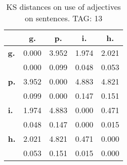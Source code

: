 \begin{table}[h!]
\begin{center}
\begin{tabular}{| l || c | c | c | c |}\hline
 & {\bf g.} & {\bf p.} & {\bf i.} & {\bf h.} \\\hline\hline
{\bf g.} & 0.000 & 3.952 & 1.974 & 2.021 \\
{\bf } & 0.000 & 0.099 & 0.048 & 0.053 \\\hline
{\bf p.} & 3.952 & 0.000 & 4.883 & 4.821 \\
{\bf } & 0.099 & 0.000 & 0.147 & 0.151 \\\hline
{\bf i.} & 1.974 & 4.883 & 0.000 & 0.471 \\
{\bf } & 0.048 & 0.147 & 0.000 & 0.015 \\\hline
{\bf h.} & 2.021 & 4.821 & 0.471 & 0.000 \\
{\bf } & 0.053 & 0.151 & 0.015 & 0.000 \\\hline
\end{tabular}
\caption{KS distances on use of adjectives on sentences. TAG: 13}
\end{center}
\end{table}